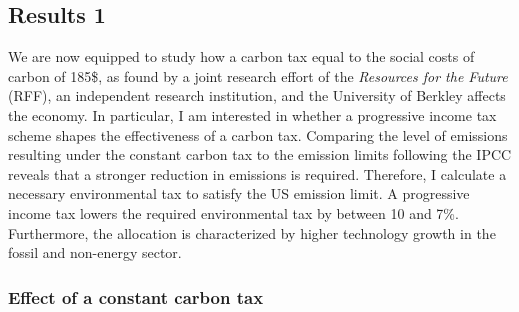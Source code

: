 \subsection{Results 1}\label{subsec:exp}


We are now equipped to study how a carbon tax  equal to the social costs of carbon of 185\$, as found by a joint research effort of the \textit{Resources for the Future} (RFF), an independent research institution, and the University of Berkley \citep{RFF} affects the economy. In particular, I am interested in whether a progressive income tax scheme shapes the effectiveness of a carbon tax. 
 Comparing the level of emissions resulting under the constant carbon tax to the emission limits following the IPCC reveals that a stronger reduction in emissions is required. Therefore, I calculate a necessary environmental tax to satisfy the US emission limit. A progressive income tax lowers the required environmental tax by between 10 and 7\%. Furthermore, the allocation is characterized by higher technology growth in the fossil and non-energy sector. 


\subsubsection{Effect of a constant carbon tax}\label{subsec:eff_cc}

